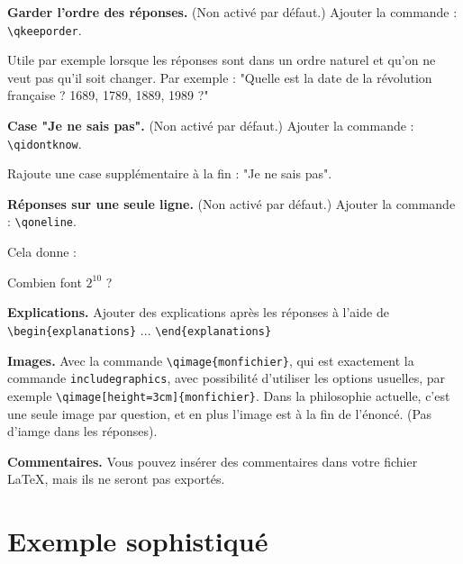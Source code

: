 \documentclass[12pt,a4paper]{article}
\begin{document}
\bigskip
\textbf{Garder l'ordre des réponses.} (Non activé par défaut.) Ajouter la commande : \verb|\qkeeporder|. 

Utile par exemple lorsque les réponses sont dans un ordre naturel et qu'on ne veut pas qu'il soit changer. Par exemple : "Quelle est la date de la révolution française ? 1689, 1789, 1889, 1989 ?" 

\bigskip
\textbf{Case "Je ne sais pas".} (Non activé par défaut.) Ajouter la commande : \verb|\qidontknow|.

Rajoute une case supplémentaire à la fin : "Je ne sais pas".


\bigskip
\textbf{Réponses sur une seule ligne.} (Non activé par défaut.) Ajouter la commande : \verb|\qoneline|.

Cela donne :
\begin{center}
\begin{minipage}{0.8\textwidth}
\begin{question}
\qoneline
Combien font $2^{10}$ ?
\begin{answers}
\end{answers}
\end{question}
\end{minipage}
\end{center}

\bigskip
\textbf{Explications.} Ajouter des explications après les réponses à l'aide de
\verb|\begin{explanations}| ... \verb|\end{explanations}|

\bigskip
\textbf{Images.} Avec la commande \verb|\qimage{monfichier}|, qui est exactement la commande \verb|includegraphics|, avec possibilité d'utiliser les options usuelles, par exemple \verb|\qimage[height=3cm]{monfichier}|.
Dans la philosophie actuelle, c'est une seule image par question, et en plus l'image est à la fin de l'énoncé. (Pas d'iamge dans les réponses).

\bigskip
\textbf{Commentaires.} Vous pouvez insérer des commentaires dans votre fichier \LaTeX, mais ils ne seront pas exportés. 



\section{Exemple sophistiqué}
\end{document}
